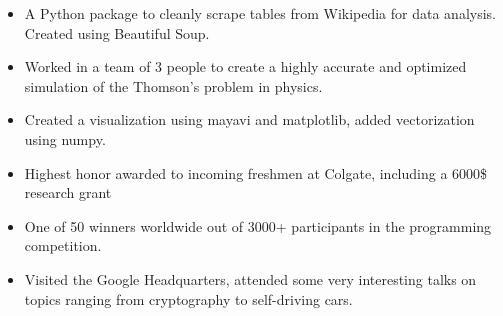 \documentclass[a4paper]{resume}
\begin{document}
\begin{itemize} \vspace{-5pt} \itemsep -2pt
	\item A Python package to cleanly scrape tables from Wikipedia for data analysis. Created using Beautiful Soup.
\end{itemize}
\enresubsection
{}
\begin{itemize} \vspace{-5pt} \itemsep -2pt
	\item Worked in a team of 3 people to create a highly accurate and optimized simulation of the Thomson’s problem in physics.
	\item Created a visualization using mayavi and matplotlib, added vectorization using numpy.
\end{itemize}
\enresection

\begin{itemize} \vspace{-5pt} \itemsep -2pt
	\item Highest honor awarded to incoming freshmen at Colgate, including a 6000\$ research grant
\end{itemize}
\enresubsection
{}
\begin{itemize} \vspace{-5pt} \itemsep -2pt
	\item One of 50 winners worldwide out of 3000+ participants in the programming competition.
	\item Visited the Google Headquarters, attended some very interesting talks on topics ranging from cryptography to self-driving cars.
\end{itemize}
\enresection
\end{document}
